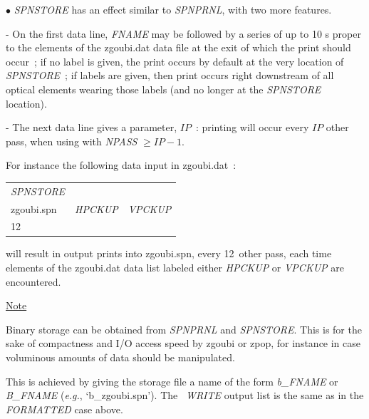{\medskip

\noindent  $\bullet$   \textsl{SPNSTORE} has an effect similar to \textsl{SPNPRNL}, with two more features. 

- On the first data line, \textsl{FNAME} may be followed 
by a series of up to 10 \LABEL s proper to the elements of the zgoubi.dat data 
file at the exit of which the print should occur~; if no label is given, 
the print occurs by default at the very location of \textsl{SPNSTORE}~; 
if  labels are given, then print occurs right downstream of all optical elements wearing those labels
 (and no longer at the \textsl{SPNSTORE} location). 

- The next data line 
gives a parameter, $IP$~: printing will occur every $IP$ other pass, when 
using \REBELOTE{} with \textsl{NPASS} $ \geq IP-1$. 

For instance the following data input in zgoubi.dat~: 

\medskip

{\renewcommand{\arraystretch}{1}
\begin{tabular}{lll}
	\textsl{SPNSTORE} &  &   \\
	zgoubi.spn \index{zgoubi.fai} & \textsl{HPCKUP} & \textsl{VPCKUP}  \\
	12 &  & 
\end{tabular}}

\medskip

\noindent will result in output prints into zgoubi.spn, every 12~other 
pass, each time elements of the zgoubi.dat  data list labeled either \textsl{HPCKUP}
or \textsl{VPCKUP} are encountered.

\medskip

\noindent\underline{Note}

\medskip

\noindent Binary storage can be obtained from \textsl{SPNPRNL} and \textsl{SPNSTORE}. This is for 
the sake of compactness and I/O access speed by zgoubi  or zpop, for instance  in case  voluminous amounts of 
data should be manipulated. 

\noindent This is achieved by giving the storage file a name of the form \textsl{b\_FNAME} 
or \textsl{B\_FNAME}  (\emph{e.g.}, `b\_zgoubi.spn'). The \FORTRAN\ \textsl{WRITE} output list 
is the same as in the \textsl{FORMATTED} case above.  







}
